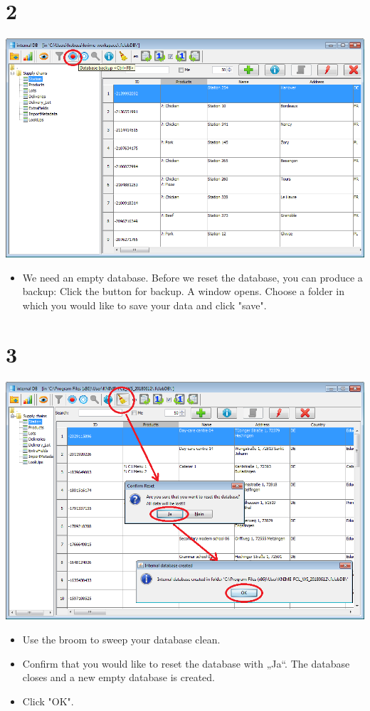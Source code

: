 \documentclass[10pt]{beamer}
\begin{document}
\section{2}
\begin{frame}
	\begin{center}
			\includegraphics[height=0.6\textheight]{2.png}
	\end{center}
	\begin{itemize}
		\item We need an empty database. Before we reset the database, you can produce a backup: Click the button for backup. A window opens. Choose a folder in which you would like to save your data and click "save".
	\end{itemize}
\end{frame}

\section{3}
\begin{frame}
	\begin{center}
			\includegraphics[height=0.6\textheight]{3.png}
	\end{center}
	\begin{itemize}
		\item Use the broom to sweep your database clean.
		\item Confirm that you would like to reset the database with „Ja“. The database closes and a new empty database is created.
		\item Click "OK".
	\end{itemize}
\end{frame}
\end{document}
